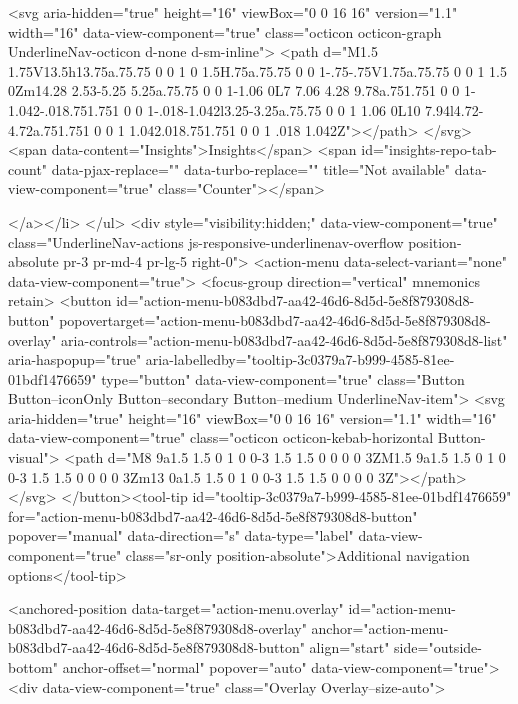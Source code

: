               <svg aria-hidden="true" height="16" viewBox="0 0 16 16" version="1.1" width="16" data-view-component="true" class="octicon octicon-graph UnderlineNav-octicon d-none d-sm-inline">
    <path d="M1.5 1.75V13.5h13.75a.75.75 0 0 1 0 1.5H.75a.75.75 0 0 1-.75-.75V1.75a.75.75 0 0 1 1.5 0Zm14.28 2.53-5.25 5.25a.75.75 0 0 1-1.06 0L7 7.06 4.28 9.78a.751.751 0 0 1-1.042-.018.751.751 0 0 1-.018-1.042l3.25-3.25a.75.75 0 0 1 1.06 0L10 7.94l4.72-4.72a.751.751 0 0 1 1.042.018.751.751 0 0 1 .018 1.042Z"></path>
</svg>
        <span data-content="Insights">Insights</span>
          <span id="insights-repo-tab-count" data-pjax-replace="" data-turbo-replace="" title="Not available" data-view-component="true" class="Counter"></span>


    
</a></li>
</ul>
    <div style="visibility:hidden;" data-view-component="true" class="UnderlineNav-actions js-responsive-underlinenav-overflow position-absolute pr-3 pr-md-4 pr-lg-5 right-0">      <action-menu data-select-variant="none" data-view-component="true">
  <focus-group direction="vertical" mnemonics retain>
    <button id="action-menu-b083dbd7-aa42-46d6-8d5d-5e8f879308d8-button" popovertarget="action-menu-b083dbd7-aa42-46d6-8d5d-5e8f879308d8-overlay" aria-controls="action-menu-b083dbd7-aa42-46d6-8d5d-5e8f879308d8-list" aria-haspopup="true" aria-labelledby="tooltip-3c0379a7-b999-4585-81ee-01bdf1476659" type="button" data-view-component="true" class="Button Button--iconOnly Button--secondary Button--medium UnderlineNav-item">  <svg aria-hidden="true" height="16" viewBox="0 0 16 16" version="1.1" width="16" data-view-component="true" class="octicon octicon-kebab-horizontal Button-visual">
    <path d="M8 9a1.5 1.5 0 1 0 0-3 1.5 1.5 0 0 0 0 3ZM1.5 9a1.5 1.5 0 1 0 0-3 1.5 1.5 0 0 0 0 3Zm13 0a1.5 1.5 0 1 0 0-3 1.5 1.5 0 0 0 0 3Z"></path>
</svg>
</button><tool-tip id="tooltip-3c0379a7-b999-4585-81ee-01bdf1476659" for="action-menu-b083dbd7-aa42-46d6-8d5d-5e8f879308d8-button" popover="manual" data-direction="s" data-type="label" data-view-component="true" class="sr-only position-absolute">Additional navigation options</tool-tip>


<anchored-position data-target="action-menu.overlay" id="action-menu-b083dbd7-aa42-46d6-8d5d-5e8f879308d8-overlay" anchor="action-menu-b083dbd7-aa42-46d6-8d5d-5e8f879308d8-button" align="start" side="outside-bottom" anchor-offset="normal" popover="auto" data-view-component="true">
  <div data-view-component="true" class="Overlay Overlay--size-auto">
    
